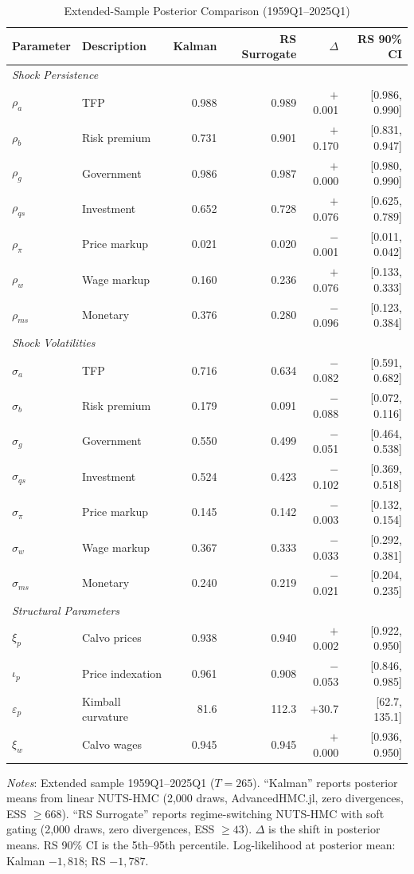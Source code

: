 \documentclass[12pt]{article}
\theoremstyle{plain}
\theoremstyle{definition}
\theoremstyle{remark}
\begin{document}
\begin{table}[htbp]
\centering
\caption{Extended-Sample Posterior Comparison (1959Q1--2025Q1)}
\label{tab:extended_sample_posterior}
\begin{tabular}{llrrrr}
\toprule
Parameter & Description & Kalman & RS Surrogate & $\Delta$ & RS 90\% CI \\
\midrule
\multicolumn{6}{l}{\textit{Shock Persistence}} \\
$\rho_a$ & TFP & 0.988 & 0.989 & $+$0.001 & [0.986, 0.990] \\
$\rho_b$ & Risk premium & 0.731 & 0.901 & $+$0.170 & [0.831, 0.947] \\
$\rho_g$ & Government & 0.986 & 0.987 & $+$0.000 & [0.980, 0.990] \\
$\rho_{qs}$ & Investment & 0.652 & 0.728 & $+$0.076 & [0.625, 0.789] \\
$\rho_{\pi}$ & Price markup & 0.021 & 0.020 & $-$0.001 & [0.011, 0.042] \\
$\rho_w$ & Wage markup & 0.160 & 0.236 & $+$0.076 & [0.133, 0.333] \\
$\rho_{ms}$ & Monetary & 0.376 & 0.280 & $-$0.096 & [0.123, 0.384] \\
\midrule
\multicolumn{6}{l}{\textit{Shock Volatilities}} \\
$\sigma_a$ & TFP & 0.716 & 0.634 & $-$0.082 & [0.591, 0.682] \\
$\sigma_b$ & Risk premium & 0.179 & 0.091 & $-$0.088 & [0.072, 0.116] \\
$\sigma_g$ & Government & 0.550 & 0.499 & $-$0.051 & [0.464, 0.538] \\
$\sigma_{qs}$ & Investment & 0.524 & 0.423 & $-$0.102 & [0.369, 0.518] \\
$\sigma_{\pi}$ & Price markup & 0.145 & 0.142 & $-$0.003 & [0.132, 0.154] \\
$\sigma_w$ & Wage markup & 0.367 & 0.333 & $-$0.033 & [0.292, 0.381] \\
$\sigma_{ms}$ & Monetary & 0.240 & 0.219 & $-$0.021 & [0.204, 0.235] \\
\midrule
\multicolumn{6}{l}{\textit{Structural Parameters}} \\
$\xi_p$ & Calvo prices & 0.938 & 0.940 & $+$0.002 & [0.922, 0.950] \\
$\iota_p$ & Price indexation & 0.961 & 0.908 & $-$0.053 & [0.846, 0.985] \\
$\varepsilon_p$ & Kimball curvature & 81.6 & 112.3 & $+$30.7 & [62.7, 135.1] \\
$\xi_w$ & Calvo wages & 0.945 & 0.945 & $+$0.000 & [0.936, 0.950] \\
\bottomrule
\end{tabular}
\smallskip
{\footnotesize \textit{Notes}: Extended sample 1959Q1--2025Q1 ($T=265$). ``Kalman'' reports posterior means from linear NUTS-HMC (2,000 draws, AdvancedHMC.jl, zero divergences, ESS $\geq 668$). ``RS Surrogate'' reports regime-switching NUTS-HMC with soft gating (2,000 draws, zero divergences, ESS $\geq 43$). $\Delta$ is the shift in posterior means. RS 90\% CI is the 5th--95th percentile. Log-likelihood at posterior mean: Kalman $-1{,}818$; RS $-1{,}787$.}
\end{table}
\end{document}
